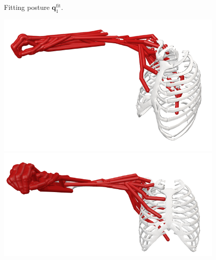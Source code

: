 \begin{figure}[!htb]
\begin{minipage}{0.3\linewidth}
    \end{minipage}
    \caption{Fitting posture $\mathbf{q}_1^{\text{fit}}$.}
    \label{fig:pose_1}
\end{figure}

\begin{figure}[!htb]
    \centering
    \captionsetup{justification=centering}
    \begin{minipage}{0.3\linewidth}
        \centering
        \includegraphics[trim={0 0 0 0}, clip, width=1\linewidth]{img/chapter_4/pose_4_view.png}
    \end{minipage}
    \hfill
    \begin{minipage}{0.3\linewidth}
        \captionsetup{justification=centering}
        \centering
        \includegraphics[trim={10 0 0 0}, clip, width=1\linewidth]{img/chapter_4/pose_4_front.png}
    \end{minipage}
    \hfill
    \begin{minipage}{0.3\linewidth}
        \captionsetup{justification=centering}
        \centering

\end{minipage}
\end{figure}
